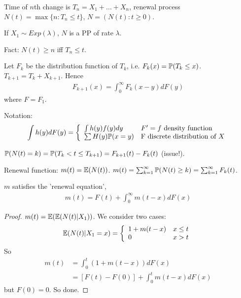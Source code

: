 \documentclass[a4paper]{article}
\begin{document}
Time of $n$th change is $T_n = X_1 + ... + X_n$, renewal process $N(t) = \max\{ n:T_n \leq t\}$, $N = (N(t) : t \geq 0)$.

If $X_1 \sim Exp(\lambda)$, $N$ is a PP of rate $\lambda$.

Fact: $N(t) \geq n$ iff $T_n \leq t$.

Let $F_k$ be the distribution function of $T_k$, i.e. $F_k(x) = \P(T_k \leq x)$. $T_{k+1} = T_k + X_{k+1}$. Hence
\begin{equation*}
\begin{aligned}
F_{k+1} (x) = \int_0^\infty F_k(x-y) dF(y)
\end{aligned}
\end{equation*}
where $F=F_1$.

Notation:
\begin{equation*}
\begin{aligned}
\int h(y) dF(y) = \left\{ \begin{array}{ll}
\int h(y) f(y) dy & F' = f \text{ density function}\\
\sum H(y) \P(x=y) & \text{F discrete distribution of }X
\end{array}
\right.
\end{aligned}
\end{equation*}

$\P(N(t) = k) = \P(T_k < t \leq T_{k+1}) = F_{k+1}(t) - F_k(t)$ (issue!).

Renewal function: $m(t) = \E(N(t))$. $m(t) = \sum_{k=1}^\infty \P(N(t) \geq k) = \sum_{k=1}^\infty F_k(t)$.

\begin{thm}
$m$ satisfies the 'renewal equation',
\begin{equation*}
\begin{aligned}
m(t) = F(t) + \int_0^\infty m(t-x) dF(x)
\end{aligned}
\end{equation*}
\begin{proof}
$m(t) = \E(\E(N(t)|X_1))$. We consider two cases:
\begin{equation*}
\begin{aligned}
\E(N(t)|X_1=x) = \left\{\begin{array}{ll}
1 + m(t-x) & x\leq t\\
0 & x>t
\end{array}
\right.
\end{aligned}
\end{equation*}
So
\begin{equation*}
\begin{aligned}
m(t) &= \int_0^t (1+m(t-x)) dF(x)\\
&= [F(t) - F(0)] + \int_0^t m(t-x) dF(x)
\end{aligned}
\end{equation*}
but $F(0) = 0$. So done.
\end{proof}
\end{thm}
\end{document}
